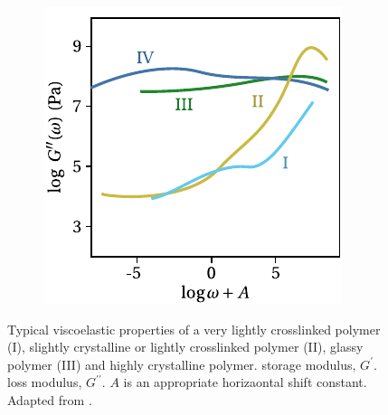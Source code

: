 \begin{figure}[hbtp]
\begin{subfigure}[b]{0.45\textwidth}
						\includegraphics[width=\textwidth]{figures/loss_modulus_scp}
						\caption{}
						\label{subfig:loss_modulus_scp}
		\end{subfigure}
	\caption{Typical viscoelastic properties of a very lightly crosslinked polymer (I), slightly crystalline or lightly crosslinked polymer (II), glassy polymer (III) and highly crystalline polymer.  storage modulus, $G^\prime$.  loss modulus, $G^{\prime\prime}$. $A$ is an appropriate horizaontal shift constant. Adapted from \cite{ferryViscoelasticPropertiesPolymers1980}.}
\label{fig:dma_scp}
\end{figure}

